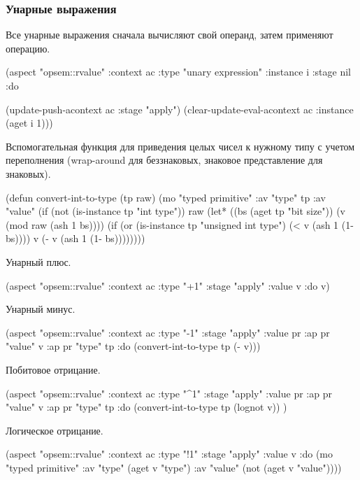 \documentclass[12pt,twoside,russian]{article}
\begin{document}
\subsubsection{Унарные выражения}
Все унарные выражения сначала вычисляют свой операнд, затем применяют операцию.

\begin{ABMLCode}
(aspect "opsem::rvalue" :context ac :type "unary expression" :instance i 
  :stage nil :do 
  
  (update-push-acontext ac :stage "apply")
  (clear-update-eval-acontext ac :instance (aget i 1)))
\end{ABMLCode}

Вспомогательная функция для приведения целых чисел к нужному типу с учетом переполнения (wrap-around для беззнаковых, знаковое представление для знаковых).

\begin{ABMLCode}
(defun convert-int-to-type (tp raw)
  (mo "typed primitive" :av "type" tp :av "value" 
    (if (not (is-instance tp "int type")) raw
      (let* ((bs (aget tp "bit size")) (v (mod raw (ash 1 bs))))
        (if (or (is-instance tp "unsigned int type") 
                (< v (ash 1 (1- bs)))) 
            v 
            (- v (ash 1 (1- bs))))))))
\end{ABMLCode}

Унарный плюс.

\begin{ABMLCode}
(aspect "opsem::rvalue" :context ac :type "+1" :stage "apply" 
  :value v :do v)
\end{ABMLCode}

Унарный минус.

\begin{ABMLCode}
(aspect "opsem::rvalue" :context ac :type "-1" :stage "apply" 
  :value pr :ap pr "value" v :ap pr "type" tp 
  :do (convert-int-to-type tp (- v)))
\end{ABMLCode}

Побитовое отрицание.

\begin{ABMLCode}
(aspect "opsem::rvalue" :context ac :type "^1" :stage "apply" 
  :value pr :ap pr "value" v :ap pr "type" tp 
  :do (convert-int-to-type tp (lognot v))
)
\end{ABMLCode}

Логическое отрицание.

\begin{ABMLCode}
(aspect "opsem::rvalue" :context ac :type "!1" :stage "apply" 
  :value v :do 
  (mo "typed primitive" :av "type" (aget v "type") 
                        :av "value" (not (aget v "value"))))
\end{ABMLCode}
\end{document}
